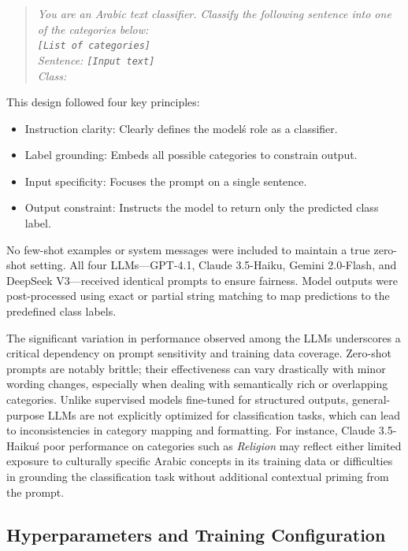 \documentclass[preprint,12pt,authoryear]{elsarticle}
\begin{document}
\begin{quote}
\textit{You are an Arabic text classifier. Classify the following sentence into one of the categories below:\\
\texttt{[List of categories]}\\
Sentence: \texttt{[Input text]}\\
Class:}
\end{quote}

This design followed four key principles:
\begin{itemize}
    \item Instruction clarity: Clearly defines the model\'s role as a classifier.
    \item Label grounding: Embeds all possible categories to constrain output.
    \item Input specificity: Focuses the prompt on a single sentence.
    \item Output constraint: Instructs the model to return only the predicted class label.
\end{itemize}

No few-shot examples or system messages were included to maintain a true zero-shot setting. All four LLMs—GPT-4.1, Claude 3.5-Haiku, Gemini 2.0-Flash, and DeepSeek V3—received identical prompts to ensure fairness. Model outputs were post-processed using exact or partial string matching to map predictions to the predefined class labels.

The significant variation in performance observed among the LLMs underscores a critical dependency on prompt sensitivity and training data coverage. Zero-shot prompts are notably brittle; their effectiveness can vary drastically with minor wording changes, especially when dealing with semantically rich or overlapping categories. Unlike supervised models fine-tuned for structured outputs, general-purpose LLMs are not explicitly optimized for classification tasks, which can lead to inconsistencies in category mapping and formatting. For instance, Claude 3.5-Haiku\'s poor performance on categories such as \textit{Religion} may reflect either limited exposure to culturally specific Arabic concepts in its training data or difficulties in grounding the classification task without additional contextual priming from the prompt.

\subsection{Hyperparameters and Training Configuration}
\end{document}
